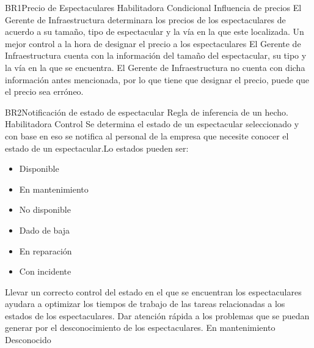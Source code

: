 \hypertarget{BR:BR1}{}
\begin{BussinesRule}{BR1}{Precio de Espectaculares}%
    \BRitem[Tipo: ] Habilitadora
    \BRitem[Clase:] Condicional
    \BRitem[Nivel:] Influencia de precios
    \BRitem[Descripción:] El Gerente de Infraestructura determinara los precios de los espectaculares de acuerdo a su tamaño, tipo de espectacular y la vía en la que este localizada.
    \BRitem[Motivación: ] Un mejor control 
    a la hora de designar el precio a los espectaculares
     El Gerente de Infraestructura cuenta con la información del tamaño del espectacular, su tipo y la vía en la que se encuentra.
     El Gerente de Infraestructura no cuenta con dicha información antes mencionada, por lo que tiene que designar el precio, puede que el precio sea erróneo.
\end{BussinesRule}

\hypertarget{BR:BR2}{}
\begin{BussinesRule}{BR2}{Notificación de estado de espectacular}
    \BRitem[Tipo: ] Regla de inferencia de un hecho.
    \BRitem[Clase:] Habilitadora
    \BRitem[Nivel:] Control
    \BRitem[Descripción:] Se determina el estado de un espectacular seleccionado y con base en eso se notifica al personal de la empresa que necesite conocer el estado de un espectacular.Lo estados pueden ser:
    \begin{itemize}
        \item Disponible
        \item En mantenimiento
        \item No disponible
        \item Dado de baja
        \item En reparación
        \item Con incidente
    \end{itemize}
    \BRitem[Motivación:] Llevar un correcto control del estado en el que se encuentran los espectaculares ayudara a optimizar los tiempos de trabajo de las tareas relacionadas a los estados de los espectaculares. 
    \BRitem[Motivación:] Dar atención rápida a los problemas que se puedan generar por el desconocimiento de los espectaculares.
    En mantenimiento
    Desconocido
\end{BussinesRule}

